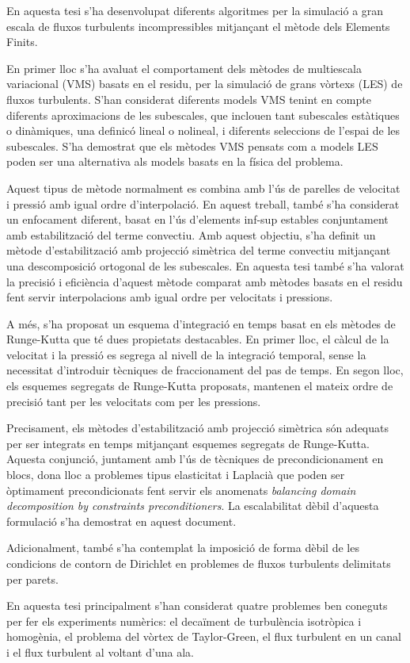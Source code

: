 En aquesta tesi s'ha desenvolupat diferents algoritmes per la simulació a gran escala de fluxos turbulents incompressibles mitjançant el mètode dels Elements Finits.

En primer lloc s'ha avaluat el comportament dels mètodes de multiescala variacional (VMS) basats en el residu, per la simulació de grans vòrtexs (LES) de fluxos turbulents. S'han considerat diferents models VMS tenint en compte diferents aproximacions de les subescales, que inclouen tant subescales estàtiques o dinàmiques, una definicó lineal o nolineal, i diferents seleccions de l'espai de les subescales. S'ha demostrat que els mètodes VMS pensats com a models LES poden ser una alternativa als models basats en la física del problema.

Aquest tipus de mètode normalment es combina amb l'ús de parelles de velocitat i pressió amb igual ordre d'interpolació. En aquest treball, també s'ha considerat un enfocament diferent, basat en l'ús d'elements inf-sup estables conjuntament amb estabilització del terme convectiu. Amb aquest objectiu, s'ha definit un mètode d'estabilització amb projecció simètrica del terme convectiu mitjançant una descomposició ortogonal de les subescales. En aquesta tesi també s'ha valorat la precisió i eficiència d'aquest mètode comparat amb mètodes basats en el residu fent servir interpolacions amb igual ordre per velocitats i pressions.

A més, s'ha proposat un esquema d'integració en temps basat en els mètodes de Runge-Kutta que té dues propietats destacables. En primer lloc, el càlcul de la velocitat i la pressió es segrega al nivell de la integració temporal, sense la necessitat d'introduir tècniques de fraccionament del pas de temps. En segon lloc, els esquemes segregats de Runge-Kutta proposats, mantenen el mateix ordre de precisió tant per les velocitats com per les pressions. 

Precisament, els mètodes d'estabilització amb projecció simètrica són adequats per ser integrats en temps mitjançant esquemes segregats de Runge-Kutta. Aquesta conjunció, juntament amb l'ús de tècniques de precondicionament en blocs, dona lloc a problemes tipus elasticitat i Laplacià que poden ser òptimament precondicionats fent servir els anomenats \textit{balancing domain decomposition by constraints preconditioners}. La escalabilitat dèbil d'aquesta formulació s'ha demostrat en aquest document.

Adicionalment, també s'ha contemplat la imposició de forma dèbil de les condicions de contorn de Dirichlet en problemes de fluxos turbulents delimitats per parets.

En aquesta tesi principalment s'han considerat quatre problemes ben coneguts per fer els experiments numèrics: el decaïment de turbulència isotròpica i homogènia, el problema del vòrtex de Taylor-Green, el flux turbulent en un canal i el flux turbulent al voltant d'una ala.